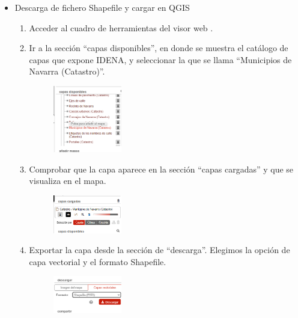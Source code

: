 \begin{itemize}
    \item Descarga de fichero Shapefile y cargar en QGIS
    
    \begin{enumerate}
        \item Acceder al cuadro de herramientas del visor web \cite{IDENA}.         
        \item Ir a la sección “capas disponibles”, en donde se muestra el catálogo de capas que expone IDENA, y seleccionar la que se llama “Municipios de Navarra (Catastro)”.
        
        \begin{figure}[H]
            \centering
            \includegraphics[width=0.30\textwidth]{Imagenes/caso-practico/capas-disponibles.png}
        \end{figure}

        \item Comprobar que la capa aparece en la sección “capas cargadas” y que se visualiza en el mapa.
        
        \begin{figure}[H]
            \centering
            \includegraphics[width=0.30\textwidth]{Imagenes/caso-practico/capas-cargadas.png}
        \end{figure}

        \item Exportar la capa desde la sección de “descarga”. Elegimos la opción de capa vectorial y el formato Shapefile.
        
        \begin{figure}[H]
            \centering
            \includegraphics[width=0.30\textwidth]{Imagenes/caso-practico/descargar.png}
        \end{figure}


\end{enumerate}
\end{itemize}
